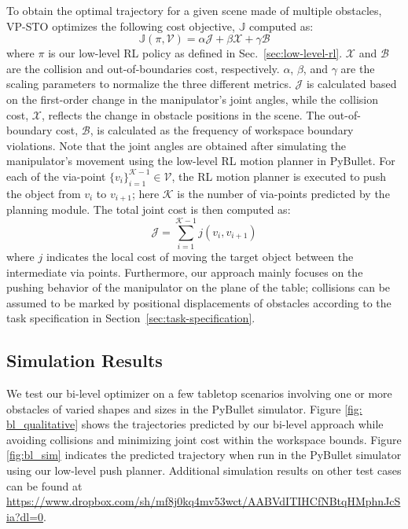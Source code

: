 To obtain the optimal trajectory for a given scene made of multiple obstacles, VP-STO optimizes the following cost objective, $\mathbb{J}$ computed as:
\begin{equation}
    \mathbb{J}(\pi, \mathcal{V}) = \alpha\mathcal{J} + \beta\mathcal{X} + \gamma\mathcal{B} 
\end{equation}
where $\pi$ is our low-level RL policy as defined in Sec.~\ref{sec:low-level-rl}. $\mathcal{X}$ and $\mathcal{B}$ are the collision and out-of-boundaries cost, respectively. $\alpha$, $\beta$, and $\gamma$ are the scaling parameters to normalize the three different metrics.  $\mathcal{J}$ is calculated based on the first-order change in the manipulator's joint angles, while the collision cost, $\mathcal{X}$, reflects the change in obstacle positions in the scene. The out-of-boundary cost, $\mathcal{B}$, is calculated as the frequency of workspace boundary violations. Note that the joint angles are obtained after simulating the manipulator's movement using the low-level RL motion planner in PyBullet. For each of the via-point $\{v_i\}_{i=1}^{\mathcal{K}-1} \in \mathcal{V}$, the RL motion planner is executed to push the object from $v_i$ to $v_{i+1}$; here $\mathcal{K}$ is the number of via-points predicted by the planning module. The total joint cost is then computed as:
\begin{equation}
\label{eqn:joint-cost}
    \mathcal{J} = \sum_{i=1}^{\mathcal{K}-1} j(v_i, v_{i+1})
\end{equation}
where $j$ indicates the local cost of moving the target object between the intermediate via points. Furthermore, our approach mainly focuses on the pushing behavior of the manipulator on the plane of the table; collisions can be assumed to be marked by positional displacements of obstacles according to the task specification in Section~\ref{sec:task-specification}.

\subsection{Simulation Results}\label{sec:bl_results}

We test our bi-level optimizer on a few tabletop scenarios involving one or more obstacles of varied shapes and sizes in the PyBullet simulator. Figure \ref{fig: bl_qualitative} shows the trajectories predicted by our bi-level approach while avoiding collisions and minimizing joint cost within the workspace bounds. Figure \ref{fig:bl_sim} indicates the predicted trajectory when run in the PyBullet simulator using our low-level push planner. Additional simulation results on other test cases can be found at \url{https://www.dropbox.com/sh/mf8j0kq4mv53wct/AABVdITIHCfNBtqHMphnJcSia?dl=0}.


